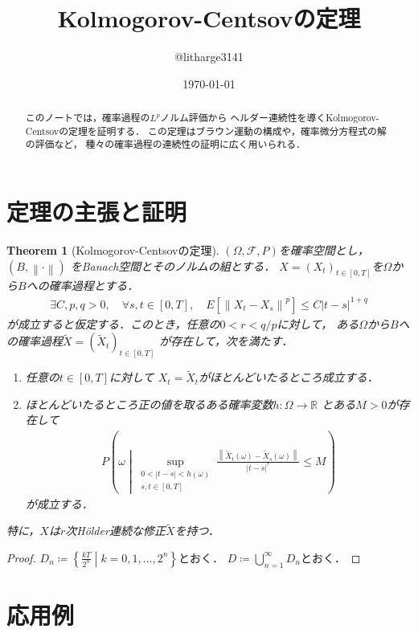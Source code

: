 \documentclass[dvipdfmx,autodetect-engine]{jsarticle}
\newtheorem{theorem}{Theorem}[section]
\theoremstyle{remark}
\theoremstyle{definition}
\newcommand{\R}{\mathbb{R}}
\newcommand{\abs}[1]{\left\lvert#1\right\rvert}
\newcommand{\norm}[1]{\left\lVert#1\right\rVert}
\newcommand{\setmid}{\mathrel{} \middle| \mathrel{}}
\begin{document}
\title{Kolmogorov-Centsovの定理}
\author{@litharge3141}
\date{\today}
\maketitle

\begin{abstract}
    このノートでは，確率過程の$L^p$ノルム評価から
    ヘルダー連続性を導くKolmogorov-Centsovの定理を証明する．
    この定理はブラウン運動の構成や，確率微分方程式の解の評価など，
    種々の確率過程の連続性の証明に広く用いられる．
\end{abstract}

\section{定理の主張と証明}
\begin{theorem}[Kolmogorov-Centsovの定理]
    $(\Omega,\mathcal{F},P)$を確率空間とし，$(B,\norm{\cdot})$
    をBanach空間とそのノルムの組とする．
    $X=(X_{t})_{t \in [0,T]}$を$\Omega$から$B$への確率過程とする．
    \begin{align}
        \exists C,p,q>0,\quad \forall s,t \in [0,T],
        \quad E[\norm{X_{t} - X_{s}}^p] \leq C \abs{t-s}^{1+q}
    \end{align}
    が成立すると仮定する．このとき，任意の$0 < r < q/p$に対して，
    ある$\Omega$から$B$への確率過程$\tilde{X}=(\tilde{X}_{t})_{t \in [0,T]}$
    が存在して，次を満たす．
    \begin{enumerate}
        \item 任意の$t \in [0,T]$に対して
        $X_t = \tilde{X}_t$がほとんどいたるところ成立する．
        \item ほとんどいたるところ正の値を取るある確率変数$h\colon \Omega \to \R$
        とある$M>0$が存在して
        \begin{align}
            P\left(\omega \setmid 
            \sup_{\substack{0 < \abs{t-s} < h(\omega) \\ s,t \in [0,T]}}
            \frac{\norm{\tilde{X}_{t}(\omega) - 
            \tilde{X}_{s}(\omega)}}{\abs{t-s}^{r}} 
            \leq M
            \right)
        \end{align}
        が成立する．
    \end{enumerate}
    特に，$X$は$r$次H\"{o}lder連続な修正$\tilde{X}$を持つ．
\end{theorem}

\begin{proof}
    $D_{n} \coloneqq \left\{\frac{kT}{2^n} \setmid k=0,1,\ldots,2^{n}\right\}$とおく．
    $D \coloneqq \bigcup_{n=1}^{\infty} D_n$とおく．
\end{proof}

\section{応用例}
\end{document}
